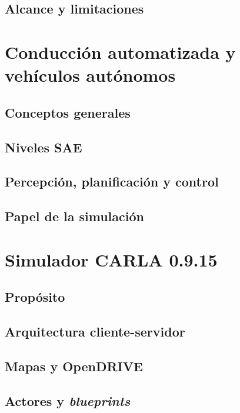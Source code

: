 \subsection{Alcance y limitaciones}

\section{Conducción automatizada y vehículos autónomos}

\subsection{Conceptos generales}

\subsection{Niveles SAE}

\subsection{Percepción, planificación y control}

\subsection{Papel de la simulación}

\section{Simulador CARLA 0.9.15}

\subsection{Propósito}

\subsection{Arquitectura cliente-servidor}

\subsection{Mapas y OpenDRIVE}

\subsection{Actores y \textit{blueprints}}

